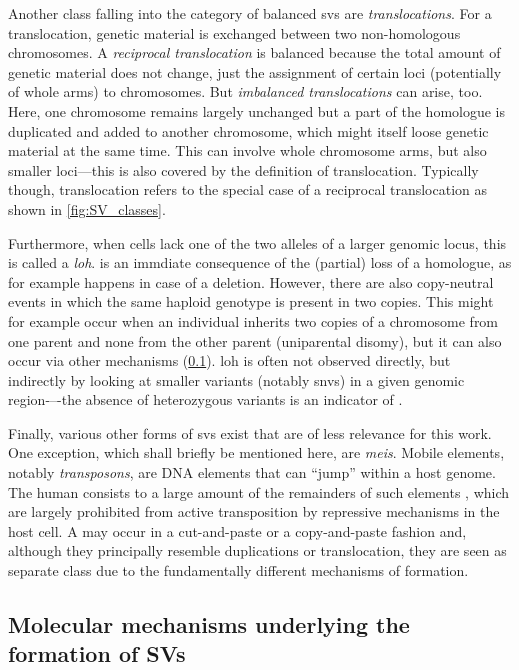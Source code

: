 Another class falling into the category of balanced \acp{sv} are
\emph{translocations}. For a translocation, genetic
material is exchanged between two non-homologous chromosomes. A \emph{reciprocal
translocation} is balanced because the total amount of genetic material does
not change, just the assignment of certain loci (potentially of whole arms)
to chromosomes.
But \emph{imbalanced translocations} can arise, too. Here, one chromosome remains
largely unchanged but a part of the homologue is duplicated and added to another
chromosome, which might itself loose genetic material at the same time. This can
involve whole chromosome arms, but also smaller loci---this is also covered by
the definition of translocation. Typically though, translocation refers to the
special case of a reciprocal translocation as shown in \cref{fig:SV_classes}.

Furthermore, when cells lack one of the two alleles of a larger genomic locus,
this is called a \emph{\acf{loh}}. \loh is an immdiate consequence of the
(partial) loss of a homologue, as for example happens in case of a deletion.
However, there are also copy-neutral \loh events in which the same haploid
genotype is present in two copies. This might for example occur when an
individual inherits two copies of a chromosome from one parent and none from the
other parent (uniparental disomy), but it can also occur via other mechanisms
(\cref{sec:mechanisms}). \Ac{loh} is often not observed directly, but indirectly
by looking at smaller variants (notably \acp{snv}) in a given genomic
region-–-the absence of heterozygous variants is an indicator of \loh.

Finally, various other forms of \acp{sv} exist that are of less relevance for
this work. One exception, which shall briefly be mentioned here, are
\emph{\acfp{mei}}. Mobile elements, notably \emph{transposons}, are DNA elements
that can ``jump'' within a host genome. The human consists to a large amount of
the remainders of such elements \citep{Haubold2006}, which are largely
prohibited from active transposition by repressive mechanisms in the host cell.
A \mei may occur in a cut-and-paste or a copy-and-paste fashion and, although
they principally resemble duplications or translocation, they are seen as
separate class due to the fundamentally different mechanisms of formation.





\subsection{Molecular mechanisms underlying the formation of SVs}
\label{sec:mechanisms}

